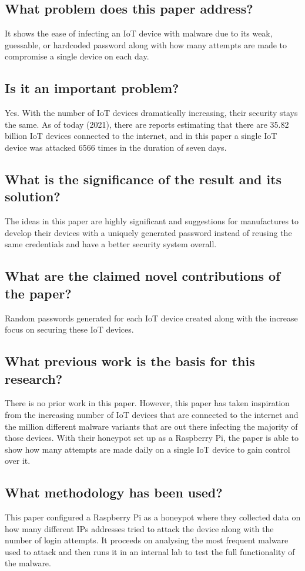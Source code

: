 \documentclass[11pt,a4paper]{article}
\begin{document}
\subsection*{What problem does this paper address?}
It shows the ease of infecting an IoT device with malware due to its weak, guessable, or hardcoded password along with how many attempts are made to compromise a single device on each day.

\subsection*{Is it an important problem?}
Yes. With the number of IoT devices dramatically increasing, their security stays the same. As of today (2021), there are reports estimating that there are 35.82 billion IoT devices connected to the internet, and in this paper a single IoT device was attacked 6566 times in the duration of seven days. 

\subsection*{What is the significance of the result and its solution?}
The ideas in this paper are highly significant and suggestions for manufactures to develop their devices with a uniquely generated password instead of reusing the same credentials and have a better security system overall. 

\subsection*{What are the claimed novel contributions of the paper?}
Random passwords generated for each IoT device created along with the increase focus on securing these IoT devices.

\subsection*{What previous work is the basis for this research?}
There is no prior work in this paper. However, this paper has taken inspiration from the increasing number of IoT devices that are connected to the internet and the million different malware variants that are out there infecting the majority of those devices. With their honeypot set up as a Raspberry Pi, the paper is able to show how many attempts are made daily on a single IoT device to gain control over it.

\subsection*{What methodology has been used?}
This paper configured a Raspberry Pi as a honeypot where they collected data on how many different IPs addresses tried to attack the device along with the number of login attempts. It proceeds on analysing the most frequent malware used to attack and then runs it in an internal lab to test the full functionality of the malware.
\end{document}
